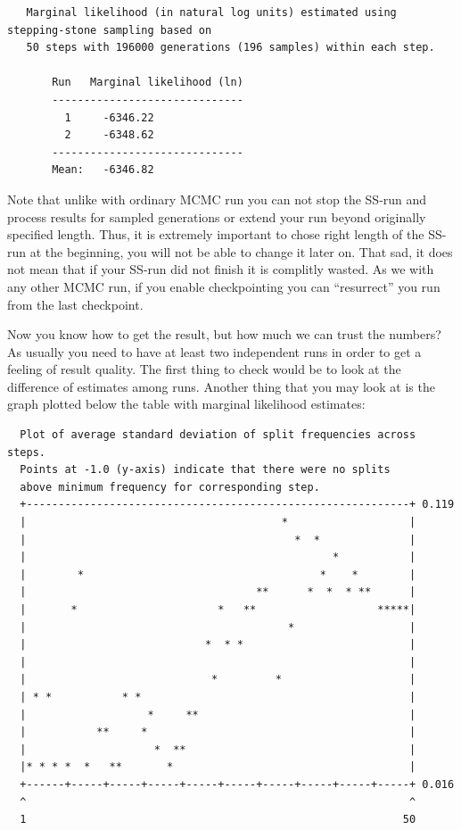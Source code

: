 \documentclass[12pt]{book}
\begin{document}
\begin{singlespacing}
\scriptsize
\begin{verbatim}
   Marginal likelihood (in natural log units) estimated using stepping-stone sampling based on
   50 steps with 196000 generations (196 samples) within each step.

       Run   Marginal likelihood (ln)
       ------------------------------
         1     -6346.22
         2     -6348.62
       ------------------------------
       Mean:   -6346.82
\end{verbatim}
\normalsize
\end{singlespacing}

Note that unlike with ordinary MCMC run you can not stop the SS-run and process results for sampled
generations or extend your run beyond originally specified length. Thus, it is extremely important
to chose right length of the SS-run at the beginning, you will not be able to change it later on.
That sad, it does not mean that if your SS-run did not finish it is complitly wasted.  As we with
any other MCMC run, if you enable checkpointing you can “resurrect” you run from the last
checkpoint. 


Now you know how to get the result, but how much we can trust the numbers? As usually you need to
have at least two independent runs in order to get a feeling of result quality. The first thing to
check would be to look at the difference of estimates among runs. Another thing that you may look
at is the graph plotted below the table with marginal likelihood estimates:

\begin{singlespacing}
\begin{verbatim}
  Plot of average standard deviation of split frequencies across steps.
  Points at -1.0 (y-axis) indicate that there were no splits
  above minimum frequency for corresponding step.
  +------------------------------------------------------------+ 0.119
  |                                        *                   |
  |                                          *  *              |
  |                                                *           |
  |        *                                     *    *        |
  |                                    **      *  *  * **      |
  |       *                      *   **                   *****|
  |                                         *                  |
  |                            *  * *                          |
  |                                                            |
  |                             *         *                    |
  | * *           * *                                          |
  |                   *     **                                 |
  |           **     *                                         |
  |                    *  **                                   |
  |* * * *  *   **       *                                     |
  +------+-----+-----+-----+-----+-----+-----+-----+-----+-----+ 0.016
  ^                                                            ^
  1                                                           50
\end{verbatim}
\end{singlespacing}
\end{document}
